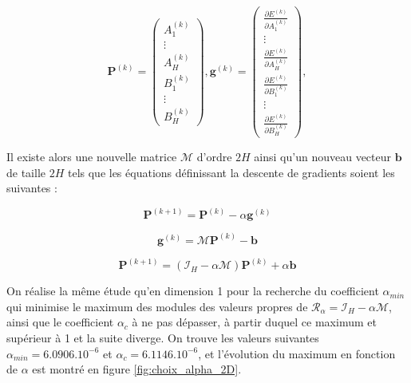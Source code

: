 \documentclass[12pt]{report}
\begin{document}
\begin{equation}
    \bm{P}^{(k)} = \begin{pmatrix}
        A_1^{(k)} \\
        \vdots    \\
        A_H^{(k)} \\
        B_1^{(k)} \\
        \vdots    \\
        B_H^{(k)}
    \end{pmatrix},
    \bm{g}^{(k)} = \begin{pmatrix}
        \frac{\partial E^{(k)}}{\partial A_1^{(k)}} \\
        \vdots                                      \\
        \frac{\partial E^{(k)}}{\partial A_H^{(k)}} \\
        \frac{\partial E^{(k)}}{\partial B_1^{(k)}} \\
        \vdots                                      \\
        \frac{\partial E^{(k)}}{\partial B_H^{(k)}}
    \end{pmatrix},
    \label{eq:definition_descente_gradients_2D}
\end{equation}

Il existe alors une nouvelle matrice $\mathcal{M}$ d'ordre $2H$ ainsi qu'un nouveau vecteur $\bm{b}$ de taille $2H$ tels que les équations définissant la descente de gradients soient les suivantes :

\begin{equation}
    \bm{P}^{(k+1)} = \bm{P}^{(k)} - \alpha\bm{g}^{(k)}
    \label{eq:recurrence_descente_gradients_2D}
\end{equation}

\begin{equation}
    \bm{g}^{(k)} = \mathcal{M}\bm{P}^{(k)} - \bm{b}
    \label{eq:expression_matricielle_gradient_2D}
\end{equation}

\begin{equation}
    \bm{P}^{(k+1)} = (\mathcal{I}_H - \alpha \mathcal{M} )  \bm{P}^{(k)} + \alpha\bm{b}
    \label{eq:recurrence_descente_gradients_v2_2D}
\end{equation}

On réalise la même étude qu'en dimension 1 pour la recherche du coefficient $\alpha_{min}$ qui minimise le maximum des modules des valeurs propres de $\mathcal{R}_\alpha = \mathcal{I}_H - \alpha \mathcal{M}$, ainsi que le coefficient $\alpha_c$ à ne pas dépasser, à partir duquel ce maximum et supérieur à 1 et la suite diverge.
On trouve les valeurs suivantes $\alpha_{min} = 6.0906.10^{-6}$ et $\alpha_c = 6.1146.10^{-6}$,  et l'évolution du maximum en fonction de $\alpha$ est montré en figure \ref{fig:choix_alpha_2D}.
\end{document}
